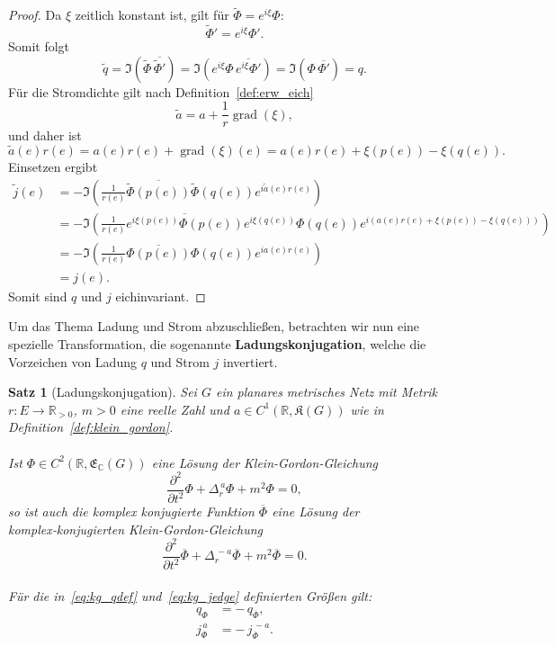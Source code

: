 \documentclass[11pt,a4paper,leqno]{report}
\newtheorem{proposition}{Satz}[chapter]
\numberwithin{equation}{chapter}
\begin{document}
\begin{proof}
	Da \(\xi\) zeitlich konstant ist, gilt für \(\tilde\Phi=e^{i\xi}\Phi\):
	\[
	\tilde\Phi'=e^{i\xi}\Phi'.
	\]
	Somit folgt
	\[
	\tilde q
	=\Im\!\left(\tilde\Phi\,\overline{\tilde\Phi'}\right)
	=\Im\!\left(e^{i\xi}\Phi\,\overline{e^{i\xi}\Phi'}\right)
	=\Im(\Phi\,\overline{\Phi'})
	=q.
	\]
	Für die Stromdichte gilt nach Definition~\ref{def:erw_eich}
	\[
	\tilde a=a+\frac1r\operatorname{grad}(\xi),
	\]
	und daher ist
	\[
	\tilde a(e)r(e)
	=a(e)r(e)+\operatorname{grad}(\xi)(e)
	=a(e)r(e)+\xi(p(e))-\xi(q(e)).
	\]
	Einsetzen ergibt
	\[
	\begin{aligned}
		\tilde j(e)
		&=-\Im\!\left(
		\frac1{r(e)}
		\overline{\tilde\Phi(p(e))}
		\tilde\Phi(q(e))
		e^{i\tilde a(e)r(e)}
		\right)\\
		&=-\Im\!\left(
		\frac1{r(e)}
		\overline{e^{i\xi(p(e))}\Phi(p(e))}
		e^{i\xi(q(e))}\Phi(q(e))
		e^{i(a(e)r(e)+\xi(p(e))-\xi(q(e)))}
		\right)\\
		&=-\Im\!\left(
		\frac1{r(e)}
		\overline{\Phi(p(e))}\Phi(q(e))
		e^{ia(e)r(e)}
		\right)\\
		&=j(e).
	\end{aligned}
	\]
	Somit sind \(q\) und \(j\) eichinvariant.
\end{proof}
\noindent
Um das Thema Ladung und Strom abzuschließen, 
betrachten wir nun eine spezielle Transformation, die sogenannte 
\textbf{Ladungskonjugation}, 
welche die Vorzeichen von Ladung $q$ und Strom $j$ invertiert.
\begin{proposition}[Ladungskonjugation]\label{prop:ladungskonjugation}
	Sei \(G\) ein planares metrisches Netz mit Metrik \(r : E \to \mathbb{R}_{>0}\), \(m>0\) eine reelle Zahl
	und $a \in C^1(\mathbb{R}, \mathfrak{K}(G))$ wie in Definition~\ref{def:klein_gordon}. \\
	\\
	Ist $\Phi \in C^2(\mathbb{R}, \mathfrak{E}_\mathbb{C}(G))$ eine Lösung der 
	Klein-Gordon-Gleichung
	\begin{equation}\label{eq:kg_phi} 
		\frac{\partial^2}{\partial t^2}\Phi
		+ \Delta_r^{\,a}\Phi
		+ m^2 \Phi = 0,
	\end{equation}
	so ist auch die komplex konjugierte Funktion $\overline{\Phi}$ eine Lösung der 
	\emph{komplex‑konjugierten Klein-Gordon-Gleichung}
	\begin{equation}\label{eq:kg_phikonj}
		\frac{\partial^2}{\partial t^2}\overline{\Phi}
		+ \Delta_r^{\,-a}\overline{\Phi}
		+ m^2 \overline{\Phi} = 0.
	\end{equation}
	\\
	Für die in~\eqref{eq:kg_qdef} und~\eqref{eq:kg_jedge} definierten Größen gilt:
	\begin{align}
		q_{\Phi} &= -\,q_{\overline{\Phi}}, \label{eq:ladung_invertiert}\\[4pt]
		j_{\Phi}^{\,a} &= -\,j_{\overline{\Phi}}^{\,-a}. \label{eq:strom_invertiert}
	\end{align}
\end{proposition}
\end{document}
